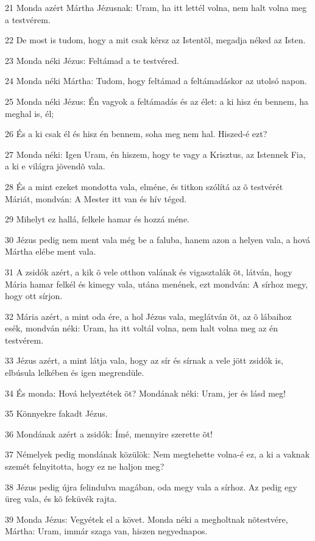 \par 21 Monda azért Mártha Jézusnak: Uram, ha itt lettél volna, nem halt volna meg a testvérem.
\par 22 De most is tudom, hogy a mit csak kérsz az Istentõl, megadja néked az Isten.
\par 23 Monda néki Jézus: Feltámad a te testvéred.
\par 24 Monda néki Mártha: Tudom, hogy feltámad a feltámadáskor az utolsó napon.
\par 25 Monda néki Jézus: Én vagyok a feltámadás és az élet: a ki hisz én bennem, ha meghal is, él;
\par 26 És a ki csak él és hisz én bennem, soha meg nem hal. Hiszed-é ezt?
\par 27 Monda néki: Igen Uram, én hiszem, hogy te vagy a Krisztus, az Istennek Fia, a ki e világra jövendõ vala.
\par 28 És a mint ezeket mondotta vala, elméne, és titkon szólítá az õ testvérét Máriát, mondván: A Mester itt van és hív téged.
\par 29 Mihelyt ez hallá, felkele hamar és hozzá méne.
\par 30 Jézus pedig nem ment vala még be a faluba, hanem azon a helyen vala, a hová Mártha elébe ment vala.
\par 31 A zsidók azért, a kik õ vele otthon valának és vigasztalák õt, látván, hogy Mária hamar felkél és kimegy vala, utána menének, ezt mondván: A sírhoz megy, hogy ott sírjon.
\par 32 Mária azért, a mint oda ére, a hol Jézus vala, meglátván õt, az õ lábaihoz esék, mondván néki: Uram, ha itt voltál volna, nem halt volna meg az én testvérem.
\par 33 Jézus azért, a mint látja vala, hogy az sír és sírnak a vele jött zsidók is, elbúsula lelkében és igen megrendüle.
\par 34 És monda: Hová helyeztétek õt? Mondának néki: Uram, jer és lásd meg!
\par 35 Könnyekre fakadt Jézus.
\par 36 Mondának azért a zsidók: Ímé, mennyire szerette õt!
\par 37 Némelyek pedig mondának közülök: Nem megtehette volna-é ez, a ki a vaknak szemét felnyitotta, hogy ez ne haljon meg?
\par 38 Jézus pedig újra felindulva magában, oda megy vala a sírhoz. Az pedig egy üreg vala, és kõ feküvék rajta.
\par 39 Monda Jézus: Vegyétek el a követ. Monda néki a megholtnak nõtestvére, Mártha: Uram, immár szaga van, hiszen negyednapos.
